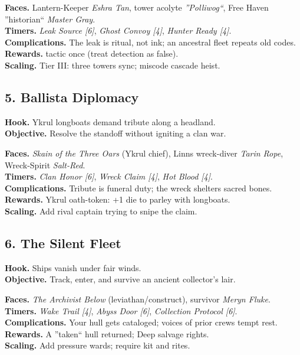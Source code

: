 \documentclass[11pt,oneside]{book}
\newcommand{\tagpill}[1]{\begingroup
  \setlength{\fboxsep}{1pt}\color{black}\fbox{\footnotesize\textsf{#1}}
\endgroup}
\begin{document}
\begin{itemize}
\textbf{Faces.} Lantern-Keeper \emph{Eshra Tan}, tower acolyte \emph{''Polliwog``}, Free Haven ''historian`` \emph{Master Gray}.\\
\textbf{Timers.} \emph{Leak Source [6]}, \emph{Ghost Convoy [4]}, \emph{Hunter Ready [4]}.\\
\textbf{Complications.} The leak is ritual, not ink; an ancestral fleet repeats old codes.\\
\textbf{Rewards.} \tagpill{GHOST CONVOY} tactic once (treat detection as false).\\
\textbf{Scaling.} Tier III: three towers sync; miscode cascade heist.

\subsection*{5. Ballista Diplomacy}
\textbf{Hook.} Ykrul longboats demand tribute along a headland.\\
\textbf{Objective.} Resolve the standoff without igniting a clan war.

\textbf{Faces.} \emph{Skain of the Three Oars} (Ykrul chief), Linns wreck-diver \emph{Tarin Rope}, Wreck-Spirit \emph{Salt-Red}.\\
\textbf{Timers.} \emph{Clan Honor [6]}, \emph{Wreck Claim [4]}, \emph{Hot Blood [4]}.\\
\textbf{Complications.} Tribute is funeral duty; the wreck shelters sacred bones.\\
\textbf{Rewards.} Ykrul oath-token: +1 die to parley with longboats.\\
\textbf{Scaling.} Add rival captain trying to snipe the claim.

\subsection*{6. The Silent Fleet}
\textbf{Hook.} Ships vanish under fair winds.\\
\textbf{Objective.} Track, enter, and survive an ancient collector's lair.

\textbf{Faces.} \emph{The Archivist Below} (leviathan/construct), survivor \emph{Meryn Fluke}.\\
\textbf{Timers.} \emph{Wake Trail [4]}, \emph{Abyss Door [6]}, \emph{Collection Protocol [6]}.\\
\textbf{Complications.} Your hull gets cataloged; voices of prior crews tempt rest.\\
\textbf{Rewards.} A ''taken`` hull returned; Deep salvage rights.\\
\textbf{Scaling.} Add pressure wards; require \tagpill{AIRFEED} kit and rites.


\end{itemize}
\end{document}
